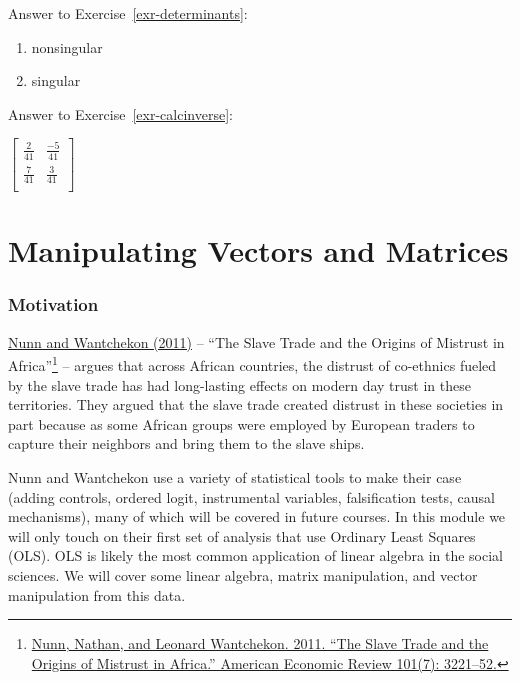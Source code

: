 \documentclass[
  letterpaper,
]{book}
\theoremstyle{definition}
\theoremstyle{definition}
\theoremstyle{plain}
\theoremstyle{definition}
\theoremstyle{plain}
\theoremstyle{plain}
\theoremstyle{remark}
\begin{document}
Answer to Exercise~\ref{exr-determinants}:

\begin{enumerate}
\def\labelenumi{\arabic{enumi}.}
\item
  nonsingular
\item
  singular
\end{enumerate}

Answer to Exercise~\ref{exr-calcinverse}:

\(\begin{bmatrix}  \frac{2}{41} & \frac{-5}{41}\\  \frac{7}{41} & \frac{3}{41}\\  \end{bmatrix}\)

\hypertarget{rmatrices}{%
\chapter{Manipulating Vectors and Matrices}\label{rmatrices}}

\hypertarget{motivation-1}{%
\subsection*{Motivation}\label{motivation-1}}

\href{https://dash.harvard.edu/bitstream/handle/1/11986331/nunn-slave-trade.pdf}{Nunn
and Wantchekon (2011)} -- ``The Slave Trade and the Origins of Mistrust
in Africa''\footnote{\href{https://dash.harvard.edu/bitstream/handle/1/11986331/nunn-slave-trade.pdf}{Nunn,
  Nathan, and Leonard Wantchekon. 2011. ``The Slave Trade and the
  Origins of Mistrust in Africa.'' American Economic Review 101(7):
  3221--52.}} -- argues that across African countries, the distrust of
co-ethnics fueled by the slave trade has had long-lasting effects on
modern day trust in these territories. They argued that the slave trade
created distrust in these societies in part because as some African
groups were employed by European traders to capture their neighbors and
bring them to the slave ships.

Nunn and Wantchekon use a variety of statistical tools to make their
case (adding controls, ordered logit, instrumental variables,
falsification tests, causal mechanisms), many of which will be covered
in future courses. In this module we will only touch on their first set
of analysis that use Ordinary Least Squares (OLS). OLS is likely the
most common application of linear algebra in the social sciences. We
will cover some linear algebra, matrix manipulation, and vector
manipulation from this data.
\end{document}
